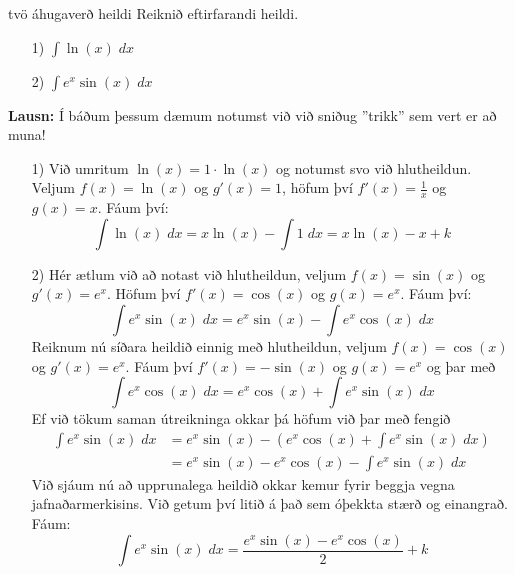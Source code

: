 \begin{syn}{tvö áhugaverð heildi}
Reiknið eftirfarandi heildi.
\begin{itemize}
\item[1)] $\displaystyle \int \ln(x) \; dx$

\item[2)] $\displaystyle \int e^{x}\sin(x) \; dx$
\end{itemize}

\vspace{2mm}

{\bf Lausn:} Í báðum þessum dæmum notumst við við sniðug ''trikk'' sem vert er að muna!

\begin{itemize}
\item[1)] Við umritum $\ln(x) = 1\cdot\ln(x)$ og notumst svo við hlutheildun. Veljum $f(x) = \ln(x)$ og $g'(x) = 1$, höfum því $f'(x) = \frac{1}{x}$ og $g(x) = x$. Fáum því:
$$
\int \ln(x) \; dx = x\ln(x) - \int 1 \; dx = x\ln(x) - x + k
$$

\item[2)] Hér ætlum við að notast við hlutheildun, veljum $f(x) = \sin(x)$ og $g'(x) = e^{x}$. Höfum því $f'(x) = \cos(x)$ og $g(x) = e^{x}$. Fáum því:
$$
\int e^{x}\sin(x) \; dx = e^{x}\sin(x) - \int e^{x}\cos(x) \; dx
$$
Reiknum nú síðara heildið einnig með hlutheildun, veljum $f(x) = \cos(x)$ og $g'(x) = e^{x}$. Fáum því $f'(x) = -\sin(x)$ og $g(x) = e^{x}$ og þar með
$$
\int e^{x}\cos(x) \; dx = e^{x}\cos(x) + \int e^{x}\sin(x) \; dx
$$
Ef við tökum saman útreikninga okkar þá höfum við þar með fengið
\setlength{\jot}{4mm}
\begin{align*}
\int e^{x}\sin(x) \; dx &= e^{x}\sin(x) - \left(e^{x}\cos(x) + \int e^{x}\sin(x) \; dx\right)\\ &= e^{x}\sin(x)-e^{x}\cos(x)-\int e^{x}\sin(x) \; dx
\end{align*}
Við sjáum nú að upprunalega heildið okkar kemur fyrir beggja vegna jafnaðarmerkisins. Við getum því litið á það sem óþekkta stærð og einangrað. Fáum:
$$
\int e^{x}\sin(x) \; dx = \frac{e^{x}\sin(x)-e^{x}\cos(x)}{2} + k
$$
\end{itemize}

\end{syn}

\if {}
{\newpage}
\fi

\label{sec:ÆfingStofnföll}
